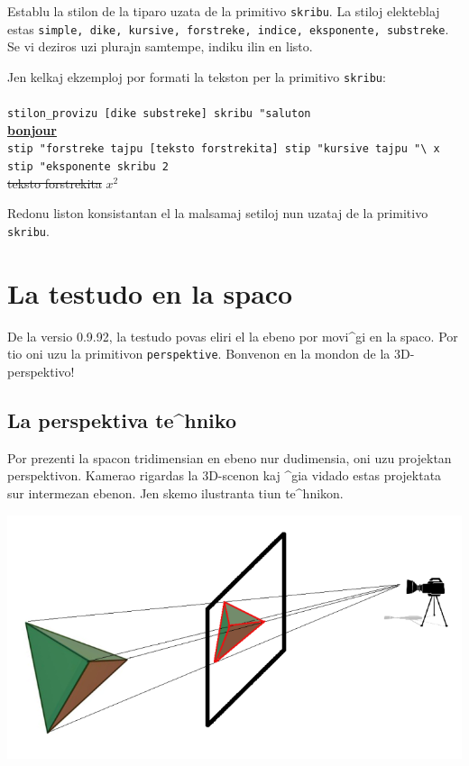 
Establu la stilon de la tiparo uzata de la primitivo
\texttt{skribu}.  La stiloj elekteblaj estas \texttt{simple,
  dike, kursive, forstreke, indice, eksponente, substreke}. 
Se vi deziros uzi plurajn samtempe, indiku ilin en listo.

Jen kelkaj ekzemploj por formati la tekston per la primitivo \texttt{skribu}:\\ \\
\texttt{stilon\_provizu [dike substreke] skribu "saluton}\\
\textbf{\underline{bonjour}}\\
\texttt{stip "forstreke tajpu [teksto forstrekita] stip "kursive tajpu "\textbackslash\ x stip "eksponente skribu 2}\\
\sout{teksto forstrekita} $x^2$


Redonu liston konsistantan el la malsamaj setiloj nun uzataj de la
primitivo \texttt{skribu}.

\section{La testudo en la spaco} \label{3D}

De la versio 0.9.92, la testudo povas eliri el la ebeno por movi^gi
en la spaco.  Por tio oni uzu la primitivon \texttt{perspektive}.
Bonvenon en la mondon de la 3D-perspektivo!

\subsection{La perspektiva te^hniko}

Por prezenti la spacon tridimensian en ebeno nur dudimensia, oni uzu
projektan perspektivon.  Kamerao rigardas la 3D-scenon kaj ^gia vidado estas projektata sur intermezan ebenon.
Jen skemo ilustranta tiun te^hnikon.

\begin{center}
\includegraphics*[scale=0.6]{bildoj/perspective.png}
\end{center}

